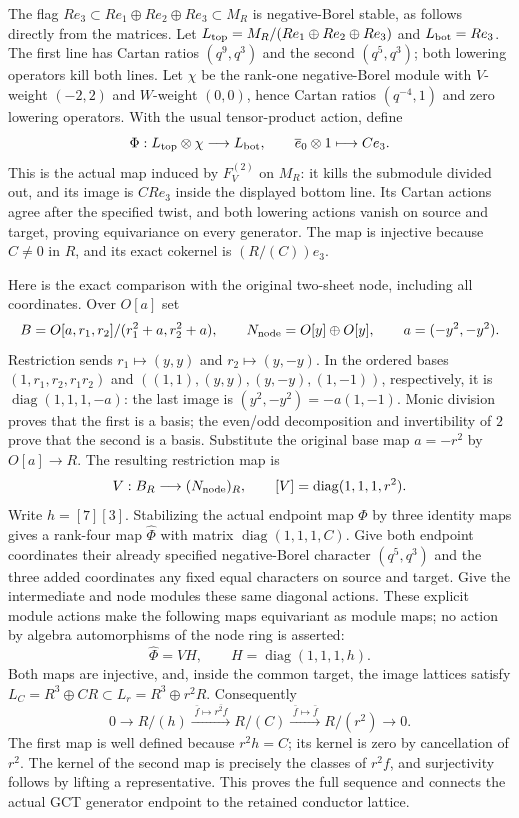 The flag $Re_3\subset Re_1\oplus Re_2\oplus Re_3\subset M_R$
is negative-Borel stable, as follows directly from the matrices.
Let $L_{\rm top}=M_R/(Re_1\oplus Re_2\oplus Re_3)$ and
$L_{\rm bot}=Re_3$. The first line has Cartan ratios $(q^9,q^3)$
and the second $(q^5,q^3)$; both lowering operators kill both lines.
Let $\chi$ be the rank-one negative-Borel module with $V$-weight
$(-2,2)$ and $W$-weight $(0,0)$, hence Cartan ratios
$(q^{-4},1)$ and zero lowering operators. With the usual tensor-product
action, define
\[
 \Phi:L_{\rm top}\otimes\chi\longrightarrow L_{\rm bot},\qquad
 \overline e_0\otimes1\longmapsto Ce_3.
\]
This is the actual map induced by $F_V^{(2)}$ on $M_R$: it kills
the submodule divided out, and its image is $CR e_3$ inside the displayed
bottom line. Its Cartan actions agree after the specified twist, and both
lowering actions vanish on source and target, proving equivariance
on every generator. The map is injective because $C\ne0$ in $R$,
and its exact cokernel is $(R/(C))e_3$.

Here is the exact comparison with the original two-sheet node, including
all coordinates. Over $O[a]$ set
\[
 B=O[a,r_1,r_2]/(r_1^2+a,r_2^2+a),\qquad
 N_{\rm node}=O[y]\oplus O[y],\qquad a=(-y^2,-y^2).
\]
Restriction sends $r_1\mapsto(y,y)$ and $r_2\mapsto(y,-y)$.
In the ordered bases
$(1,r_1,r_2,r_1r_2)$ and
$((1,1),(y,y),(y,-y),(1,-1))$, respectively, it is
$\operatorname{diag}(1,1,1,-a)$: the last image is
$(y^2,-y^2)=-a(1,-1)$. Monic division proves that the first is a
basis; the even/odd decomposition and invertibility of $2$ prove
that the second is a basis. Substitute the original base map
$a=-r^2$ by $O[a]\to R$. The resulting restriction map is
\[
 V:B_R\longrightarrow (N_{\rm node})_R,
 \qquad [V]=\operatorname{diag}(1,1,1,r^2).
\]
Write $h=[7][3]$. Stabilizing the actual endpoint map $\Phi$ by
three identity maps gives a rank-four map $\widehat\Phi$ with matrix
$\operatorname{diag}(1,1,1,C)$. Give both endpoint coordinates
their already specified negative-Borel character $(q^5,q^3)$ and
the three added coordinates any fixed equal characters on source
and target. Give the intermediate and node modules these same
diagonal actions. These explicit module actions make the following
maps equivariant as module maps; no action by algebra automorphisms
of the node ring is asserted:
\[
 \widehat\Phi=VH,\qquad H=\operatorname{diag}(1,1,1,h).
\]
Both maps are injective, and, inside the common target, the image
lattices satisfy $L_C=R^3\oplus CR\subset L_r=R^3\oplus r^2R$.
Consequently
\[
 0\longrightarrow R/(h)\xrightarrow{\;\bar f\mapsto\overline{r^2f}\;}
 R/(C)\xrightarrow{\;\bar f\mapsto\bar f\;}R/(r^2)
 \longrightarrow0.
\]
The first map is well defined because $r^2h=C$; its kernel is zero
by cancellation of $r^2$. The kernel of the second map is precisely
the classes of $r^2f$, and surjectivity follows by lifting a
representative. This proves the full sequence and connects the actual
GCT generator endpoint to the retained conductor lattice.

